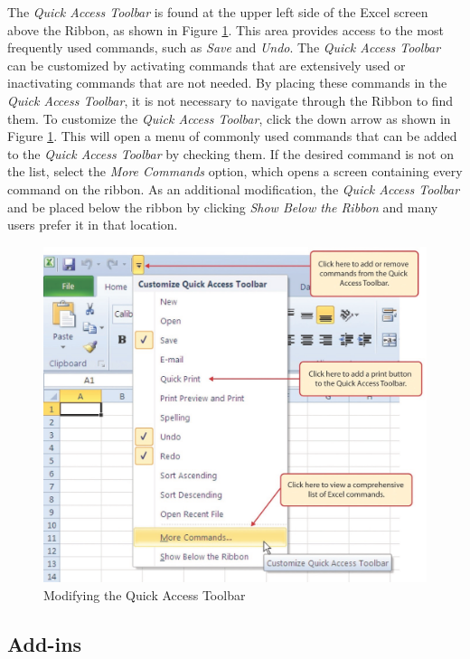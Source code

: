 The \textit{Quick Access Toolbar} is found at the upper left side of the Excel screen above the Ribbon, as shown in Figure \ref{09:fig68}. This area provides access to the most frequently used commands, such as \textit{Save} and \textit{Undo}. The \textit{Quick Access Toolbar} can be customized by activating commands that are extensively used or inactivating commands that are not needed. By placing these commands in the \textit{Quick Access Toolbar}, it is not necessary to navigate through the Ribbon to find them. To customize the \textit{Quick Access Toolbar}, click the down arrow as shown in Figure \ref{09:fig68}. This will open a menu of commonly used commands that can be added to the \textit{Quick Access Toolbar} by checking them. If the desired command is not on the list, select the \textit{More Commands} option, which opens a screen containing every command on the ribbon. As an additional modification, the \textit{Quick Access Toolbar} and be placed below the ribbon by clicking \textit{Show Below the Ribbon} and many users prefer it in that location.

\begin{figure}[H]
	\centering
	\includegraphics[width=\maxwidth{.75\linewidth}]{gfx/ch09_fig68}
	\caption{Modifying the Quick Access Toolbar}
	\label{09:fig68}
\end{figure}

\subsection{Add-ins}

